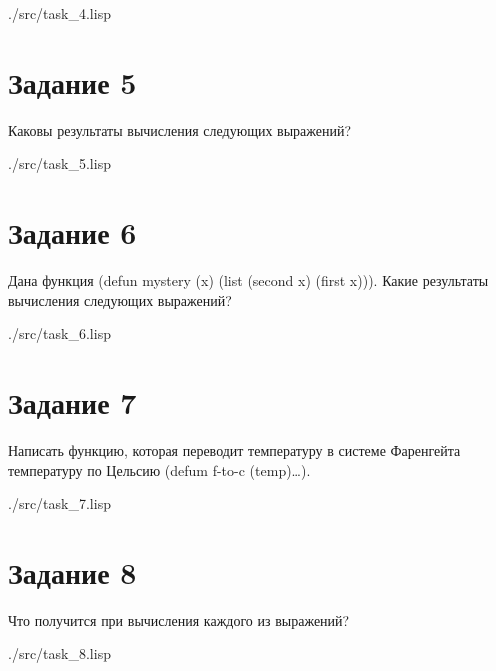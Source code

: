 \begin{lstinputlisting}[
	caption={Задание 4},
	label={lst:t4},
	style={lsp},
	]{./src/task_4.lisp}
\end{lstinputlisting}

\section*{Задание 5}
Каковы результаты вычисления следующих выражений?

\begin{lstinputlisting}[
	caption={Задание 5},
	label={lst:t5},
	style={lsp},
	]{./src/task_5.lisp}
\end{lstinputlisting}

\section*{Задание 6}
Дана функция (defun mystery (x) (list (second x) (first x))). Какие результаты вычисления следующих выражений? 

\begin{lstinputlisting}[
	caption={Задание 6},
	label={lst:t6},
	style={lsp},
	]{./src/task_6.lisp}
\end{lstinputlisting}

\section*{Задание 7}
Написать функцию, которая переводит температуру в системе Фаренгейта температуру по Цельсию (defum f-to-c (temp)…).

\begin{lstinputlisting}[
	caption={Задание 7},
	label={lst:t7},
	style={lsp},
	]{./src/task_7.lisp}
\end{lstinputlisting}

\section*{Задание 8}
Что получится при вычисления каждого из выражений?

\begin{lstinputlisting}[
	caption={Задание 8},
	label={lst:t8},
	style={lsp},
	]{./src/task_8.lisp}
\end{lstinputlisting}
